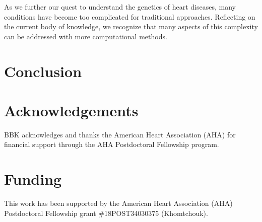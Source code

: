 \documentclass[letter]{bioinfo}
\begin{document}
	As we further our quest to understand the genetics of heart diseases, many conditions have become too complicated for traditional approaches. Reflecting on the current body of knowledge, we recognize that many aspects of this complexity can be addressed with more computational methods.
	
	
	
	\section{Conclusion}
	
	
	
	\enlargethispage{12pt}
	
	
	
	
	\section*{Acknowledgements}
	
	BBK acknowledges and thanks the American Heart Association (AHA) for financial support through the AHA Postdoctoral Fellowship program.
	\vspace*{-12pt}
	
	\section*{Funding}
	
	This work has been supported by the American Heart Association (AHA) Postdoctoral Fellowship grant \#18POST34030375 (Khomtchouk).\vspace*{-12pt}
	
	
	
	
	
	
\end{document}
